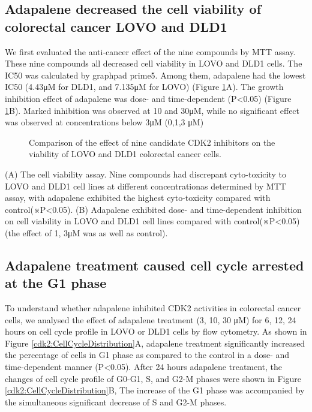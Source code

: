 \subsection{Adapalene decreased the cell viability of colorectal cancer LOVO and DLD1}

We first evaluated the anti-cancer effect of the nine compounds by MTT assay. These nine compounds all decreased cell viability in LOVO and DLD1 cells. The IC50 was calculated by graphpad prime5. Among them, adapalene had the lowest IC50 (4.43μM for DLD1, and 7.135μM for LOVO) (Figure \ref{cdk2:MTT}A). The growth inhibition effect of adapalene was dose- and time-dependent (P<0.05) (Figure \ref{cdk2:MTT}B). Marked inhibition was observed at 10 and 30μM, while no significant effect was observed at concentrations below 3μM (0,1,3 μM)

\begin{figure}
\centering
\caption{Comparison of the effect of nine candidate CDK2 inhibitors on the viability of LOVO and DLD1 colorectal cancer cells.}
\label{cdk2:MTT}
\end{figure}
(A) The cell viability assay. Nine compounds had discrepant cyto-toxicity to LOVO and DLD1 cell lines at different concentrationas determined by MTT assay, with adapalene exhibited the highest cyto-toxicity compared with control(※P<0.05). (B) Adapalene exhibited dose- and time-dependent inhibition on cell viability in LOVO and DLD1 cell lines compared with control(※P<0.05)(the effect of 1, 3μM was as well as control).

\subsection{Adapalene treatment caused cell cycle arrested at the G1 phase}

To understand whether adapalene inhibited CDK2 activities in colorectal cancer cells, we analysed the effect of adapalene treatment (3, 10, 30 μM) for 6, 12, 24 hours on cell cycle profile in LOVO or DLD1 cells by flow cytometry. As shown in Figure \ref{cdk2:CellCycleDistribution}A, adapalene treatment significantly increased the percentage of cells in G1 phase as compared to the control in a dose- and time-dependent manner (P<0.05). After 24 hours adapalene treatment, the changes of cell cycle profile of G0-G1, S, and G2-M phases were shown in Figure \ref{cdk2:CellCycleDistribution}B, The increase of the G1 phase was accompanied by the simultaneous significant decrease of S and G2-M phases.

